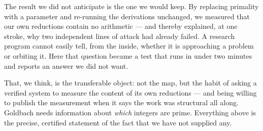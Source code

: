 \documentclass[11pt]{article}
\theoremstyle{remark}\newtheorem{remark}{Remark}
\begin{document}
The result we did not anticipate is the one we would keep. By replacing primality with
a parameter and re-running the derivations unchanged, we measured that our own
reductions contain no arithmetic --- and thereby explained, at one stroke, why two
independent lines of attack had already failed. A research program cannot easily tell,
from the inside, whether it is approaching a problem or orbiting it. Here that question
became a test that runs in under two minutes and reports an answer we did not want.

That, we think, is the transferable object: not the map, but the habit of asking a
verified system to measure the content of its own reductions --- and being willing to
publish the measurement when it says the work was structural all along. Goldbach needs
information about \emph{which} integers are prime. Everything above is the precise,
certified statement of the fact that we have not supplied any.



\end{document}
